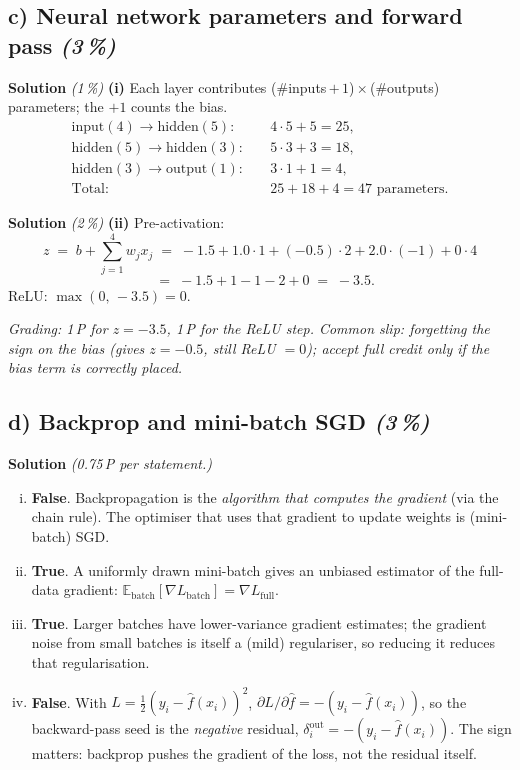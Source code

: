 \documentclass[11pt,a4paper]{article}
\newcommand{\subpoints}[1]{\textit{(#1\,\%)}}
\newcommand{\sol}{\noindent\textbf{Solution}}
\begin{document}
\subsection*{c) Neural network parameters and forward pass \subpoints{3}}

\sol{} \subpoints{1} \textbf{(i)} Each layer contributes (\#inputs\,$+\,1$)\,$\times$\,(\#outputs)
parameters; the $+1$ counts the bias.
\begin{align*}
\text{input}(4)\to\text{hidden}(5): &\quad 4\cdot 5 + 5 = 25, \\
\text{hidden}(5)\to\text{hidden}(3): &\quad 5\cdot 3 + 3 = 18, \\
\text{hidden}(3)\to\text{output}(1): &\quad 3\cdot 1 + 1 = 4, \\
\text{Total:} &\quad \boxed{25 + 18 + 4 = 47} \text{ parameters.}
\end{align*}

\medskip
\sol{} \subpoints{2} \textbf{(ii)} Pre-activation:
$$z \;=\; b + \sum_{j=1}^4 w_j x_j
   \;=\; -1.5 + 1.0\cdot 1 + (-0.5)\cdot 2 + 2.0\cdot(-1) + 0\cdot 4$$
$$\phantom{z} \;=\; -1.5 + 1 - 1 - 2 + 0 \;=\; -3.5.$$
ReLU: $\max(0,\,-3.5) = \boxed{0}$.

\noindent\emph{Grading: 1\,P for $z=-3.5$, 1\,P for the ReLU step. Common slip: forgetting the
sign on the bias (gives $z=-0.5$, still ReLU $=0$); accept full credit only if the bias term
is correctly placed.}

\subsection*{d) Backprop and mini-batch SGD \subpoints{3}}
\sol{} \emph{(0.75\,P per statement.)}
\begin{enumerate}[(i)]
  \item \textbf{False}. Backpropagation is the \emph{algorithm that computes the gradient} (via the
        chain rule). The optimiser that uses that gradient to update weights is (mini-batch) SGD.
  \item \textbf{True}. A uniformly drawn mini-batch gives an unbiased estimator of the full-data
        gradient: $\mathbb{E}_{\text{batch}}[\nabla L_{\text{batch}}] = \nabla L_{\text{full}}$.
  \item \textbf{True}. Larger batches have lower-variance gradient estimates; the gradient noise
        from small batches is itself a (mild) regulariser, so reducing it reduces that regularisation.
  \item \textbf{False}. With $L = \tfrac{1}{2}(y_i-\hat f(x_i))^2$,
        $\partial L/\partial \hat f = -(y_i-\hat f(x_i))$, so the backward-pass seed is the
        \emph{negative} residual, $\delta^{\text{out}}_i = -(y_i-\hat f(x_i))$. The sign matters:
        backprop pushes the gradient of the loss, not the residual itself.
\end{enumerate}
\end{document}

